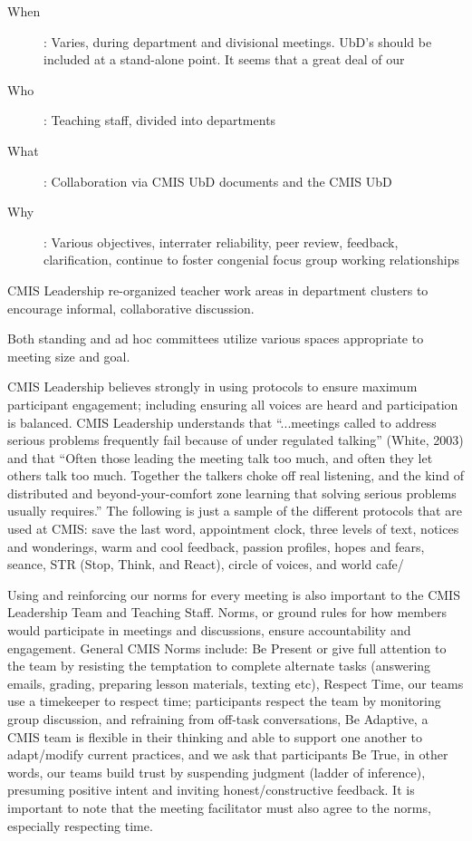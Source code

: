 \begin{findings}

\begin{description}
\item [When]: Varies, during department and divisional meetings. UbD’s should be included at a stand-alone point. It seems that a great deal of our 
\item [Who]: Teaching staff, divided into departments 
\item [What]: Collaboration via CMIS UbD documents and the CMIS UbD 
\item [Why]: Various objectives, interrater reliability, peer review, feedback, clarification, continue to foster congenial focus group working relationships
\end{description}



CMIS Leadership re-organized teacher work areas in department clusters to encourage informal, collaborative  discussion. 

Both standing and ad hoc committees utilize various spaces appropriate to meeting size and goal.

 
CMIS Leadership believes strongly in using protocols to ensure maximum participant engagement; including ensuring all voices are heard and participation is balanced. CMIS Leadership understands that “...meetings called to address serious problems frequently fail because of under regulated talking” (White, 2003)  and that “Often those leading the meeting talk too much, and often they let others talk too much. Together the talkers choke off real listening, and the kind of distributed and beyond-your-comfort zone learning that solving serious problems usually requires.” The following is just a sample of the different protocols that are used at CMIS: save the last word, appointment clock, three levels of text, notices and wonderings, warm and cool feedback, passion profiles, hopes and fears, seance, STR (Stop, Think, and React), circle of voices, and world cafe/   

Using and reinforcing our norms for every meeting is also important to the CMIS Leadership Team and Teaching Staff. Norms, or ground rules for how members would participate in meetings and discussions, ensure accountability and engagement. General CMIS Norms include: Be Present or give full attention to  the team by resisting the temptation to complete alternate tasks (answering emails, grading, preparing lesson materials, texting etc), Respect Time, our teams use a timekeeper to respect time; participants respect the team by monitoring group discussion, and refraining from off-task conversations, Be Adaptive, a CMIS team is flexible in their thinking and able to support one another to adapt/modify current practices, and we ask that participants Be True, in other words, our teams build trust by suspending judgment (ladder of inference), presuming positive intent and inviting  honest/constructive feedback. It is important to note that the meeting facilitator must also agree to the norms, especially respecting time. 


\end{findings}
